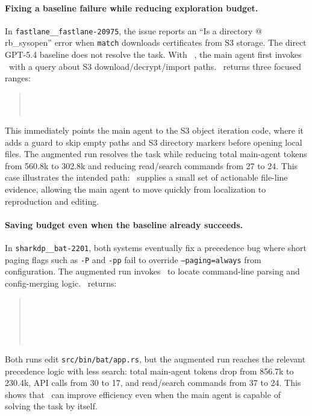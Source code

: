 \documentclass{llmxive}
\providecommand{\approach}{~}
\begin{document}
\paragraph{Fixing a baseline failure while reducing exploration budget.}
In \texttt{fastlane\_\_fastlane-20975}, the issue reports an ``Is a directory @ rb\_sysopen'' error when \texttt{match} downloads certificates from S3 storage.
The direct GPT-5.4 baseline does not resolve the task.
With \approach, the main agent first invokes \approach with a query about S3 download/decrypt/import paths.
\approach returns three focused ranges:
\begin{quote}\small
{}\\
\\
\end{quote}
This immediately points the main agent to the S3 object iteration code, where it adds a guard to skip empty paths and S3 directory markers before opening local files.
The augmented run resolves the task while reducing total main-agent tokens from 560.8k to 302.8k and reducing read/search commands from 27 to 24.
This case illustrates the intended path: \approach supplies a small set of actionable file-line evidence, allowing the main agent to move quickly from localization to reproduction and editing.

\paragraph{Saving budget even when the baseline already succeeds.}
In \texttt{sharkdp\_\_bat-2201}, both systems eventually fix a precedence bug where short paging flags such as \texttt{-P} and \texttt{-pp} fail to override \texttt{--paging=always} from configuration.
The augmented run invokes \approach to locate command-line parsing and config-merging logic.
\approach returns:
\begin{quote}\small
{}\\
\\
\\
\\
\end{quote}
Both runs edit \texttt{src/bin/bat/app.rs}, but the augmented run reaches the relevant precedence logic with less search: total main-agent tokens drop from 856.7k to 230.4k, API calls from 30 to 17, and read/search commands from 37 to 24.
This shows that \approach can improve efficiency even when the main agent is capable of solving the task by itself.
\end{document}
